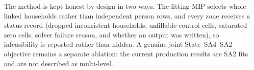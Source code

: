 \documentclass[review]{elsarticle}
\begin{document}
The method is kept honest by design in two ways. The fitting MIP selects whole
linked households rather than independent person rows, and every zone receives
a status record (dropped inconsistent households, unfillable control cells,
saturated zero cells, solver failure reason, and whether an output was
written), so infeasibility is reported rather than hidden. A genuine joint
State--SA4--SA2 objective remains a separate ablation: the current production
results are SA2 fits and are not described as multi-level.


\end{document}
